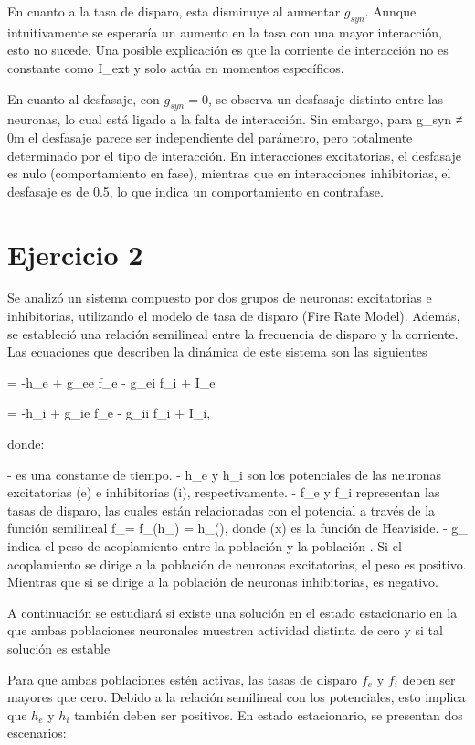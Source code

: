 \documentclass[aps,prb,twocolumn,superscriptaddress,floatfix,longbibliography]{revtex4-2}
\newcounter{para}
\begin{document}
En cuanto a la tasa de disparo, esta disminuye al aumentar \(g_{syn}\). Aunque intuitivamente se esperaría un aumento en la tasa con una mayor interacción, esto no sucede. Una posible explicación es que la corriente de interacción no es constante como I_{ext} y solo actúa en momentos específicos.

En cuanto al desfasaje, con \(g_{syn} = 0\), se observa un desfasaje distinto entre las neuronas, lo cual está ligado a la falta de interacción. Sin embargo, para g_syn ≠ 0m el desfasaje parece ser independiente del parámetro, pero totalmente determinado por el tipo de interacción. En interacciones excitatorias, el desfasaje es nulo (comportamiento en fase), mientras que en interacciones inhibitorias, el desfasaje es de 0.5, lo que indica un comportamiento en contrafase.

\section{Ejercicio 2}


Se analizó un sistema compuesto por dos grupos de neuronas: excitatorias e inhibitorias, utilizando el modelo de tasa de disparo (Fire Rate Model). Además, se estableció una relación semilineal entre la frecuencia de disparo y la corriente. Las ecuaciones que describen la dinámica de este sistema son las siguientes

\tau {} = -h_e + g_{ee} f_e - g_{ei} f_i + I_e

\tau {} = -h_i + g_{ie} f_e - g_{ii} f_i + I_i,

donde:

- \tau es una constante de tiempo.
- h_e y h_i son los potenciales de las neuronas excitatorias (e) e inhibitorias (i), respectivamente.
- f_e y f_i representan las tasas de disparo, las cuales están relacionadas con el potencial a través de la función semilineal f_\alpha = f_\alpha(h_\alpha) = h_\alpha\Theta(\alpha), donde \Theta(x) es la función de Heaviside.
- g_{\alpha \beta} indica el peso de acoplamiento entre la población \alpha y la población \beta. Si el acoplamiento se dirige a la población de neuronas excitatorias, el peso es positivo. Mientras que si se dirige a la población de neuronas inhibitorias, es negativo.

A continuación se estudiará si existe una solución en el estado estacionario en la que ambas poblaciones neuronales muestren actividad distinta de cero y si tal solución es estable

Para que ambas poblaciones estén activas, las tasas de disparo \(f_e\) y \(f_i\) deben ser mayores que cero. Debido a la relación semilineal con los potenciales, esto implica que \(h_e\) y \(h_i\) también deben ser positivos. En estado estacionario, se presentan dos escenarios:
\end{document}

